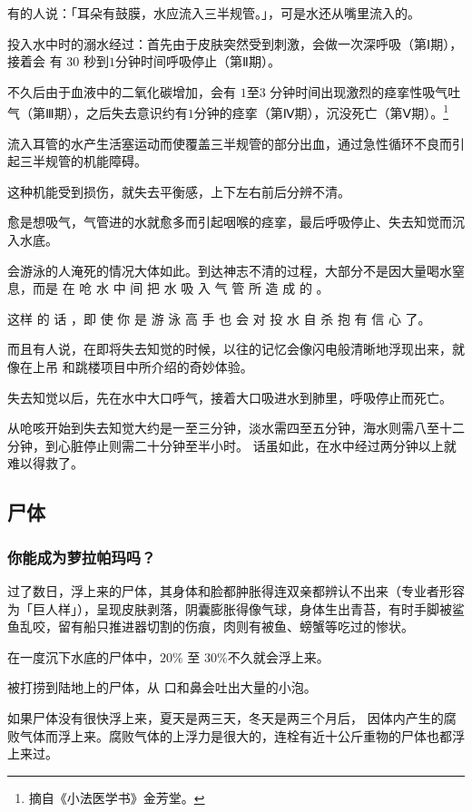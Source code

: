 \documentclass[UTF8]{ctexart}
\begin{document}
有的人说：「耳朵有鼓膜，水应流入三半规管。」，可是水还从嘴里流入的。

投入水中时的溺水经过：首先由于皮肤突然受到刺激，会做一次深呼吸（第Ⅰ期），接着会 有 $30$ 秒到$1$分钟时间呼吸停止（第Ⅱ期）。

不久后由于血液中的二氧化碳增加，会有 $1$至$3$ 分钟时间出现激烈的痉挛性吸气吐气（第Ⅲ期），之后失去意识约有$1$分钟的痉挛（第Ⅳ期），沉没死亡（第Ⅴ期）。\footnote{摘自《小法医学书》金芳堂。}

流入耳管的水产生活塞运动而使覆盖三半规管的部分出血，通过急性循环不良而引起三半规管的机能障碍。

这种机能受到损伤，就失去平衡感，上下左右前后分辨不清。

愈是想吸气，气管进的水就愈多而引起咽喉的痉挛，最后呼吸停止、失去知觉而沉入水底。

会游泳的人淹死的情况大体如此。到达神志不清的过程，大部分不是因大量喝水窒息，而是 在 呛 水 中 间 把 水 吸 入 气 管 所 造 成 的 。

这样 的 话 ，即 使 你 是 游 泳 高 手 也 会 对 投 水 自 杀 抱 有 信 心 了。

而且有人说，在即将失去知觉的时候，以往的记忆会像闪电般清晰地浮现出来，就像在上吊 和跳楼项目中所介绍的奇妙体验。

失去知觉以后，先在水中大口呼气，接着大口吸进水到肺里，呼吸停止而死亡。

从呛咳开始到失去知觉大约是一至三分钟，淡水需四至五分钟，海水则需八至十二分钟，到心脏停止则需二十分钟至半小时。
话虽如此，在水中经过两分钟以上就难以得救了。


\subsection{尸体}

\subsubsection*{你能成为萝拉帕玛吗？}

过了数日，浮上来的尸体，其身体和脸都肿胀得连双亲都辨认不出来（专业者形容为「巨人样」），呈现皮肤剥落，阴囊膨胀得像气球，身体生出青苔，有时手脚被鲨鱼乱咬，留有船只推进器切割的伤痕，肉则有被鱼、螃蟹等吃过的惨状。

在一度沉下水底的尸体中，$20\%$ 至 $30\%$不久就会浮上来。

被打捞到陆地上的尸体，从 口和鼻会吐出大量的小泡。

如果尸体没有很快浮上来，夏天是两三天，冬天是两三个月后， 因体内产生的腐败气体而浮上来。腐败气体的上浮力是很大的，连栓有近十公斤重物的尸体也都浮上来过。
\end{document}
